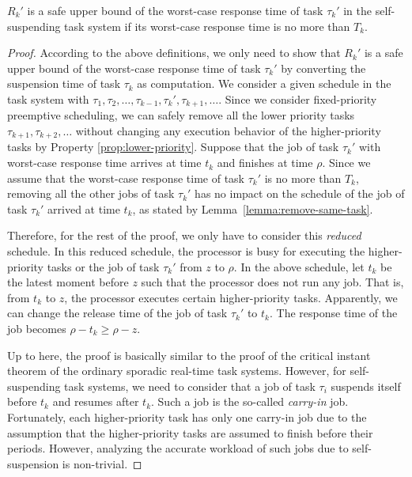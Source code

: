 \begin{theorem}
\label{theorem:critical}
 $R_k'$ is a safe upper bound of the worst-case response time of task $\tau_k'$ in the self-suspending task system if its worst-case response time is no more than $T_k$.
\end{theorem}
\begin{proof}
According to the above definitions, we only need to show that $R_k'$ is a safe upper bound of the worst-case response time of task $\tau_k'$ by converting the suspension time of task $\tau_k$ as computation. We consider a given schedule in the task system with $\tau_1, \tau_2, \ldots, \tau_{k-1}, \tau_k', \tau_{k+1}, \ldots$. Since we consider fixed-priority preemptive scheduling, we can safely remove all the lower priority tasks $\tau_{k+1}, \tau_{k+2}, \ldots$ without changing any execution behavior of the higher-priority tasks by Property \ref{prop:lower-priority}. Suppose that the job of task $\tau_k'$ with worst-case response time arrives at time $t_k$ and finishes at time $\rho$. Since we assume that the worst-case response time of task $\tau_k'$ is no more than $T_k$,  removing all the other jobs of task $\tau_k'$ has no impact on the schedule of the job of task $\tau_k'$ arrived at time $t_k$, as stated by Lemma~\ref{lemma:remove-same-task}.


Therefore, for the rest of the proof, we only have to consider this \emph{reduced} schedule. In this reduced schedule, the processor is busy for executing the higher-priority tasks or the job of task $\tau_k'$ from $z$ to $\rho$. In the above schedule, let $t_{k}$ be the latest moment before $z$ such that the processor does not run any job. That is, from $t_k$ to $z$, the processor executes certain higher-priority tasks. Apparently, we can change the release time of the job of task $\tau_k'$ to $t_k$. The response time of the job becomes $\rho-t_k \geq \rho-z$. 

Up to here, the proof is basically similar to the proof of the critical instant theorem of the ordinary sporadic real-time task systems. However, for self-suspending task systems, we need to consider that a job of task $\tau_i$ suspends itself before $t_k$ and resumes after $t_k$. Such a job is the so-called \emph{carry-in} job. Fortunately, each higher-priority task has only one carry-in job due to the assumption that the higher-priority tasks are assumed to finish before their periods. However, analyzing the accurate workload of such jobs due to self-suspension is non-trivial. 


\end{proof}
